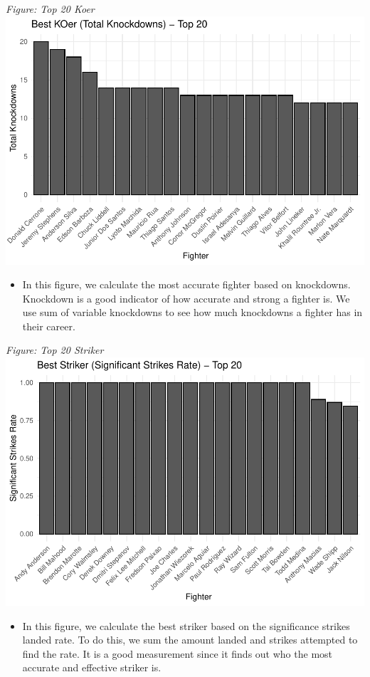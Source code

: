 \documentclass[
  man,floatsintext]{apa6}
\providecommand{\tightlist}{%
  \setlength{\itemsep}{0pt}\setlength{\parskip}{0pt}}
\begin{document}
\emph{Figure: Top 20 Koer}
\includegraphics{Into-the-UFC_files/figure-latex/unnamed-chunk-4-1.pdf}

\begin{itemize}
\tightlist
\item
  In this figure, we calculate the most accurate fighter based on knockdowns. Knockdown is a good indicator of how accurate and strong a fighter is. We use sum of variable knockdowns to see how much knockdowns a fighter has in their career.
\end{itemize}

\emph{Figure: Top 20 Striker}
\includegraphics{Into-the-UFC_files/figure-latex/unnamed-chunk-5-1.pdf}

\begin{itemize}
\tightlist
\item
  In this figure, we calculate the best striker based on the significance strikes landed rate. To do this, we sum the amount landed and strikes attempted to find the rate. It is a good measurement since it finds out who the most accurate and effective striker is.
\end{itemize}
\end{document}
